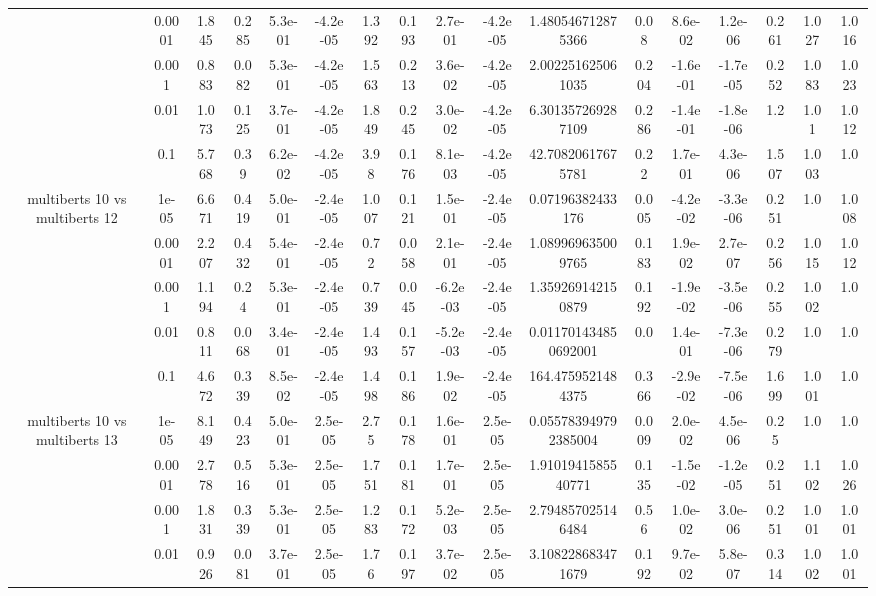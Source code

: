 \begin{tabular}{|c|c|c|c|c|c|c|c|c|c|c|c|c|c|c|c|c|}
 & 0.0001 & 1.845 & 0.285 & 5.3e-01 & -4.2e-05 & 1.392 & 0.193 & 2.7e-01 & -4.2e-05 & 1.480546712875366 & 0.08 & 8.6e-02 & 1.2e-06 & 0.261 & 1.027 & 1.016 \\
 & 0.001 & 0.883 & 0.082 & 5.3e-01 & -4.2e-05 & 1.563 & 0.213 & 3.6e-02 & -4.2e-05 & 2.002251625061035 & 0.204 & -1.6e-01 & -1.7e-05 & 0.252 & 1.083 & 1.023 \\
 & 0.01 & 1.073 & 0.125 & 3.7e-01 & -4.2e-05 & 1.849 & 0.245 & 3.0e-02 & -4.2e-05 & 6.301357269287109 & 0.286 & -1.4e-01 & -1.8e-06 & 1.2 & 1.01 & 1.012 \\
 & 0.1 & 5.768 & 0.39 & 6.2e-02 & -4.2e-05 & 3.98 & 0.176 & 8.1e-03 & -4.2e-05 & 42.70820617675781 & 0.22 & 1.7e-01 & 4.3e-06 & 1.507 & 1.003 & 1.0 \\
\hline
\multirow{5}{*}{multiberts 10 vs multiberts 12} & 1e-05 & 6.671 & 0.419 & 5.0e-01 & -2.4e-05 & 1.007 & 0.121 & 1.5e-01 & -2.4e-05 & 0.07196382433176 & 0.005 & -4.2e-02 & -3.3e-06 & 0.251 & 1.0 & 1.008 \\
 & 0.0001 & 2.207 & 0.432 & 5.4e-01 & -2.4e-05 & 0.72 & 0.058 & 2.1e-01 & -2.4e-05 & 1.089969635009765 & 0.183 & 1.9e-02 & 2.7e-07 & 0.256 & 1.015 & 1.012 \\
 & 0.001 & 1.194 & 0.24 & 5.3e-01 & -2.4e-05 & 0.739 & 0.045 & -6.2e-03 & -2.4e-05 & 1.359269142150879 & 0.192 & -1.9e-02 & -3.5e-06 & 0.255 & 1.002 & 1.0 \\
 & 0.01 & 0.811 & 0.068 & 3.4e-01 & -2.4e-05 & 1.493 & 0.157 & -5.2e-03 & -2.4e-05 & 0.011701434850692001 & 0.0 & 1.4e-01 & -7.3e-06 & 0.279 & 1.0 & 1.0 \\
 & 0.1 & 4.672 & 0.339 & 8.5e-02 & -2.4e-05 & 1.498 & 0.186 & 1.9e-02 & -2.4e-05 & 164.4759521484375 & 0.366 & -2.9e-02 & -7.5e-06 & 1.699 & 1.001 & 1.0 \\
\hline
\multirow{5}{*}{multiberts 10 vs multiberts 13} & 1e-05 & 8.149 & 0.423 & 5.0e-01 & 2.5e-05 & 2.75 & 0.178 & 1.6e-01 & 2.5e-05 & 0.055783949792385004 & 0.009 & 2.0e-02 & 4.5e-06 & 0.25 & 1.0 & 1.0 \\
 & 0.0001 & 2.778 & 0.516 & 5.3e-01 & 2.5e-05 & 1.751 & 0.181 & 1.7e-01 & 2.5e-05 & 1.9101941585540771 & 0.135 & -1.5e-02 & -1.2e-05 & 0.251 & 1.102 & 1.026 \\
 & 0.001 & 1.831 & 0.339 & 5.3e-01 & 2.5e-05 & 1.283 & 0.172 & 5.2e-03 & 2.5e-05 & 2.794857025146484 & 0.56 & 1.0e-02 & 3.0e-06 & 0.251 & 1.001 & 1.001 \\
 & 0.01 & 0.926 & 0.081 & 3.7e-01 & 2.5e-05 & 1.76 & 0.197 & 3.7e-02 & 2.5e-05 & 3.108228683471679 & 0.192 & 9.7e-02 & 5.8e-07 & 0.314 & 1.002 & 1.001 \\

\end{tabular}

